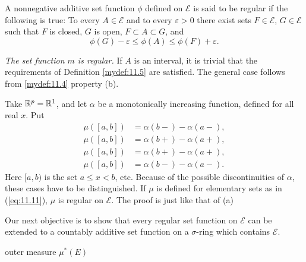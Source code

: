 
\begin{mydef}
    \label{mydef:11.5}
    A nonnegative additive set function $\phi$ defined on $\mathscr{E}$ is said to be regular if the following is true:
    To every $A \in \mathscr{E}$ and to every $\varepsilon > 0$
    there exist sets $F \in \mathscr{E}$, $G \in \mathscr{E}$
    such that $F$ is closed, $G$ is open, $F \subset A \subset G$,
    and
    \begin{equation}
        \label{eq:11.16}
        \phi(G) - \varepsilon \leq
        \phi(A) \leq
        \phi(F) + \varepsilon .
    \end{equation}
\end{mydef}

\begin{newexample}
    \label{neqexample:11.6}
    \begin{asparaenum}[(a)]
        \item \emph{The set function $m$ is regular.}
        If $A$ is an interval, it is trivial that the requirements of Definition \ref{mydef:11.5} are satisfied. The general case follows from \ref{mydef:11.4} property (b).
        \item Take ${\protect\mathbb R}^p = {\protect\mathbb R}^1$, and let $\alpha$ be a monotonically increasing function, defined for all real $x$. Put
        \begin{align*}
            \mu([a,b]) & = \alpha(b-)-\alpha(a-), \\
            \mu([a,b]) & = \alpha(b+)-\alpha(a+), \\
            \mu([a,b]) & = \alpha(b+)-\alpha(a+), \\
            \mu([a,b]) & = \alpha(b-)-\alpha(a-).
        \end{align*}
        Here $[a,b)$ is the set $a \leq x < b$, etc.
        Because of the possible discontinuities of $\alpha$, these cases have to be distinguished.
        If $\mu$ is defined for elementary sets as in (\ref{eq:11.11}), $\mu$ is regular on $\mathscr{E}$.
        The proof is just like that of (a)
    \end{asparaenum}
\end{newexample}

Our next objective is to show that every regular set function on $\mathscr{E}$ can be
extended to a countably additive set function on a $\sigma$-ring which contains $\mathscr{E}$.

\begin{mydef}
    \label{mydef:11.7}
    outer measure $\mu^*(E)$
\end{mydef}

